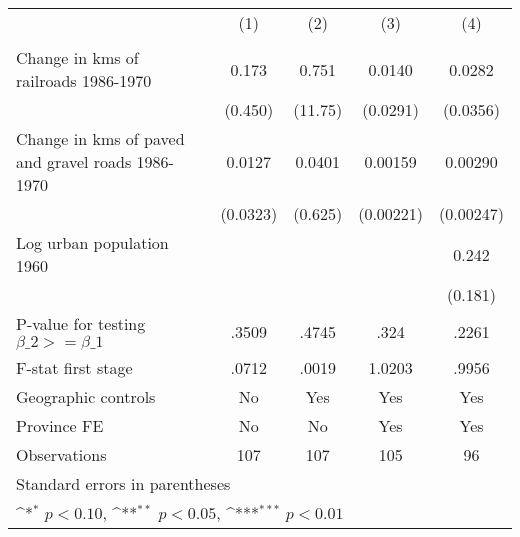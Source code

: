 {
\def\sym#1{\ifmmode^{#1}\else\(^{#1}\)\fi}
\begin{tabular}{l*{4}{c}}
\hline\hline
                &\multicolumn{1}{c}{(1)}&\multicolumn{1}{c}{(2)}&\multicolumn{1}{c}{(3)}&\multicolumn{1}{c}{(4)}\\
                &\multicolumn{1}{c}{}&\multicolumn{1}{c}{}&\multicolumn{1}{c}{}&\multicolumn{1}{c}{}\\
\hline
Change in kms of railroads 1986-1970&    0.173         &    0.751         &   0.0140         &   0.0282         \\
                &  (0.450)         &  (11.75)         & (0.0291)         & (0.0356)         \\
[1em]
Change in kms of paved and gravel roads 1986-1970&   0.0127         &   0.0401         &  0.00159         &  0.00290         \\
                & (0.0323)         &  (0.625)         &(0.00221)         &(0.00247)         \\
[1em]
Log urban population 1960&                  &                  &                  &    0.242         \\
                &                  &                  &                  &  (0.181)         \\
\hline
P-value for testing $\beta\_{2} >= \beta\_{1}$&    .3509         &    .4745         &     .324         &    .2261         \\
F-stat first stage&    .0712         &    .0019         &   1.0203         &    .9956         \\
Geographic controls&       No         &      Yes         &      Yes         &      Yes         \\
Province FE     &       No         &       No         &      Yes         &      Yes         \\
Observations    &      107         &      107         &      105         &       96         \\
\hline\hline
\multicolumn{5}{l}{\footnotesize Standard errors in parentheses}\\
\multicolumn{5}{l}{\footnotesize \sym{*} \(p<0.10\), \sym{**} \(p<0.05\), \sym{***} \(p<0.01\)}\\
\end{tabular}
}
